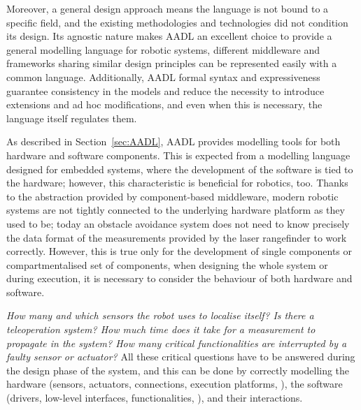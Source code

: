 Moreover, a general design approach means the language is not bound to a specific field, and the existing methodologies and technologies did not condition its design. Its agnostic nature makes AADL an excellent choice to provide a general modelling language for robotic systems, different middleware and frameworks sharing similar design principles can be represented easily with a common language. Additionally, AADL formal syntax and expressiveness guarantee consistency in the models and reduce the necessity to introduce extensions and ad hoc modifications, and even when this is necessary, the language itself regulates them.

As described in Section~\ref{sec:AADL}, AADL provides modelling tools for both hardware and software components. This is expected from a modelling language designed for embedded systems, where the development of the software is tied to the hardware; however, this characteristic is beneficial for robotics, too. Thanks to the abstraction provided by component-based middleware, modern robotic systems are not tightly connected to the underlying hardware platform as they used to be; today an obstacle avoidance system does not need to know precisely the data format of the measurements provided by the laser rangefinder to work correctly. However, this is true only for the development of single components or compartmentalised set of components, when designing the whole system or during execution, it is necessary to consider the behaviour of both hardware and software. 

\textit{How many and which sensors the robot uses to localise itself? Is there a teleoperation system? How much time does it take for a measurement to propagate in the system? How many critical functionalities are interrupted by a faulty sensor or actuator?} All these critical questions have to be answered during the design phase of the system, and this can be done by correctly modelling the hardware (sensors, actuators, connections, execution platforms, \etc), the software (drivers, low-level interfaces, functionalities, \etc), and their interactions.

